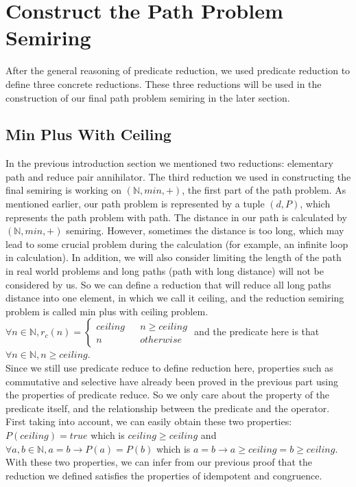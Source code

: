 \documentclass[a4paper,10pt]{article}
\begin{document}
\section{Construct the Path Problem Semiring}
After the general reasoning of predicate reduction, we used predicate reduction to define three concrete reductions. These three reductions will be used in the construction of our final path problem semiring in the later section. \\
\subsection{Min Plus With Ceiling}
In the previous introduction section we mentioned two reductions: elementary path and reduce pair annihilator. The third reduction we used in constructing the final semiring is working on $(\mathbb{N},min,+)$, the first part of the path problem. As mentioned earlier, our path problem is represented by a tuple $(d,P)$, which represents the path problem with path. The distance in our path is calculated by $(\mathbb{N},min,+)$ semiring. However, sometimes the distance is too long, which may lead to some crucial problem during the calculation (for example, an infinite loop in calculation). In addition, we will also consider limiting the length of the path in real world problems and long paths (path with long distance) will not be considered by us. So we can define a reduction that will reduce all long paths distance into one element, in which we call it ceiling, and the reduction semiring problem is called min plus with ceiling problem. $\forall n \in \mathbb{N}, r_c(n) = \left\{
\begin{aligned}
ceiling &  & n \geq ceiling \\
n &  & otherwise 
\end{aligned}
\right.$ and the predicate here is that $\forall n \in \mathbb{N}, n \geq ceiling$.\\
Since we still use predicate reduce to define reduction here, properties such as commutative and selective have already been proved in the previous part using the properties of predicate reduce. 
So we only care about the property of the predicate itself, and the relationship between the predicate and the operator.\\
First taking into account, we can easily obtain these two properties: $P(ceiling) = true$ which is $ceiling \geq ceiling$ and $\forall a,b \in \mathbb{N}, a = b \rightarrow P(a) = P(b)$ which is $a = b \rightarrow a \geq ceiling = b \geq ceiling$. With these two properties, we can infer from our previous proof that the reduction we defined satisfies the properties of idempotent and congruence.\\
\end{document}
